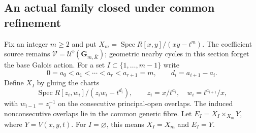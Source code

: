 \documentclass[11pt]{article}
\theoremstyle{definition}
\theoremstyle{remark}
\newcommand{\Spec}{\operatorname{Spec}}
\begin{document}
\subsection{An actual family closed under common refinement}
Fix an integer $m\geq2$ and put $X_m=\Spec R[x,y]/(xy-t^m)$.
The coefficient source remains
$\mathcal V=\mathcal U^b(\mathbf G_{m,\bar K})$; geometric nearby
cycles in this section forget the base Galois action.  For a set
$I\subset\{1,\ldots,m-1\}$ write
\[
 0=a_0<a_1<\cdots<a_r<a_{r+1}=m,\qquad
 d_i=a_{i+1}-a_i.
\]
Define $X_I$ by gluing the charts
\[
 \Spec R[z_i,w_i]/(z_iw_i-t^{d_i}),\qquad
 z_i=x/t^{a_i},\quad w_i=t^{a_{i+1}}/x,
\]
with $w_{i-1}=z_i^{-1}$ on the consecutive principal-open overlaps.
The induced nonconsecutive overlaps lie in the common generic fibre.  Let
$E_I=X_I\times_{X_m}Y$, where $Y=V(x,y,t)$.
For $I=\varnothing$, this means $X_I=X_m$ and $E_I=Y$.
\end{document}
